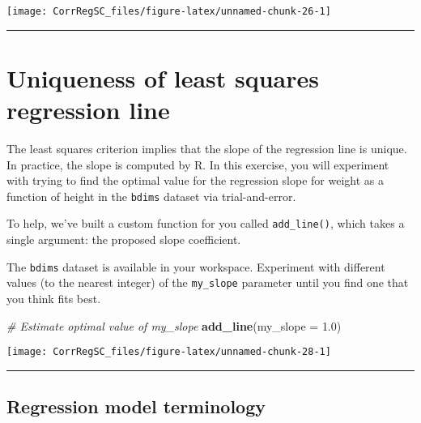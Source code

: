 \documentclass[
]{book}
\newenvironment{Shaded}{\begin{snugshade}}{\end{snugshade}}
\newcommand{\CommentTok}[1]{\textcolor[rgb]{0.56,0.35,0.01}{\textit{#1}}}
\newcommand{\DataTypeTok}[1]{\textcolor[rgb]{0.13,0.29,0.53}{#1}}
\newcommand{\FloatTok}[1]{\textcolor[rgb]{0.00,0.00,0.81}{#1}}
\newcommand{\KeywordTok}[1]{\textcolor[rgb]{0.13,0.29,0.53}{\textbf{#1}}}
\newcommand{\NormalTok}[1]{#1}
\begin{document}
\begin{center}\texttt{[image: CorrRegSC\_files/figure-latex/unnamed-chunk-26-1]} \end{center}

\begin{center}\rule{0.5\linewidth}{0.5pt}\end{center}

\hypertarget{uniqueness-of-least-squares-regression-line}{%
\section{Uniqueness of least squares regression line}\label{uniqueness-of-least-squares-regression-line}}

The least squares criterion implies that the slope of the regression line is unique. In practice, the slope is computed by R. In this exercise, you will experiment with trying to find the optimal value for the regression slope for weight as a function of height in the \texttt{bdims} dataset via trial-and-error.

To help, we've built a custom function for you called \texttt{add\_line()}, which takes a single argument: the proposed slope coefficient.

The \texttt{bdims} dataset is available in your workspace. Experiment with different values (to the nearest integer) of the \texttt{my\_slope} parameter until you find one that you think fits best.

\begin{Shaded}
\begin{Highlighting}[]
\CommentTok{# Estimate optimal value of my_slope}
\KeywordTok{add_line}\NormalTok{(}\DataTypeTok{my_slope =} \FloatTok{1.0}\NormalTok{)}
\end{Highlighting}
\end{Shaded}

\begin{center}\texttt{[image: CorrRegSC\_files/figure-latex/unnamed-chunk-28-1]} \end{center}

\begin{center}\rule{0.5\linewidth}{0.5pt}\end{center}

\hypertarget{regression-model-terminology}{%
\subsection*{Regression model terminology}\label{regression-model-terminology}}
\end{document}
